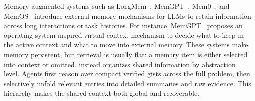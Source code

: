Memory-augmented systems such as LongMem~\citep{wang2023augmenting}, MemGPT~\citep{packer2023memgpt}, Mem0~\citep{chhikara2025mem0}, and MemOS~\citep{li2025memos} introduce external memory mechanisms for LLMs to retain information across long interactions or task histories. For instance, MemGPT~\citep{packer2023memgpt} proposes an operating-system-inspired virtual context mechanism to decide what to keep in the active context and what to move into external memory. These systems make memory persistent, but retrieval is usually flat: a memory item is either selected into context or omitted. \toolName{} instead organizes shared information by abstraction level. Agents first reason over compact verified gists across the full problem, then selectively unfold relevant entries into detailed summaries and raw evidence. This hierarchy makes the shared context both global and recoverable.

